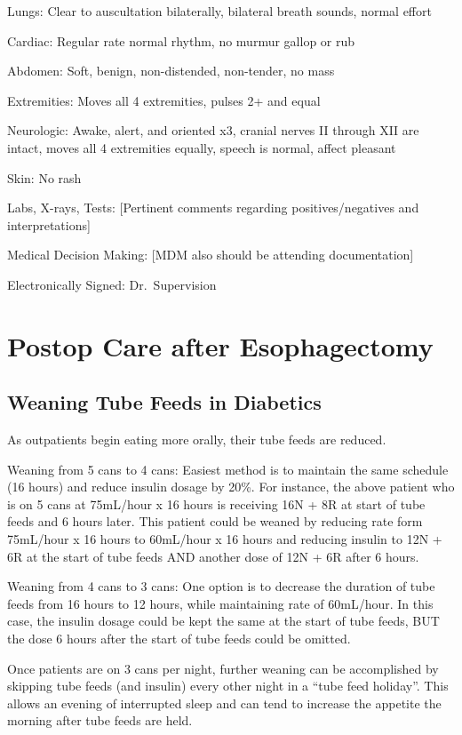 \documentclass[
]{book}
\begin{document}
Lungs: Clear to auscultation bilaterally, bilateral breath sounds, normal effort

Cardiac: Regular rate normal rhythm, no murmur gallop or rub

Abdomen: Soft, benign, non-distended, non-tender, no mass

Extremities: Moves all 4 extremities, pulses 2+ and equal

Neurologic: Awake, alert, and oriented x3, cranial nerves II through XII are intact, moves all 4 extremities equally, speech is normal, affect pleasant

Skin: No rash

Labs, X-rays, Tests: {[}Pertinent comments regarding positives/negatives and interpretations{]}

Medical Decision Making: {[}MDM also should be attending documentation{]}

Electronically Signed: Dr.~Supervision

\hypertarget{mie_postop}{%
\chapter{Postop Care after Esophagectomy}\label{mie_postop}}

\hypertarget{weaning-tube-feeds-in-diabetics}{%
\section{Weaning Tube Feeds in Diabetics}\label{weaning-tube-feeds-in-diabetics}}

As outpatients begin eating more orally, their tube feeds are reduced.

Weaning from 5 cans to 4 cans: Easiest method is to maintain the same schedule (16 hours) and reduce insulin dosage by 20\%. For instance, the above patient who is on 5 cans at 75mL/hour x 16 hours is receiving 16N + 8R at start of tube feeds and 6 hours later. This patient could be weaned by reducing rate form 75mL/hour x 16 hours to 60mL/hour x 16 hours and reducing insulin to 12N + 6R at the start of tube feeds AND another dose of 12N + 6R after 6 hours.

Weaning from 4 cans to 3 cans: One option is to decrease the duration of tube feeds from 16 hours to 12 hours, while maintaining rate of 60mL/hour. In this case, the insulin dosage could be kept the same at the start of tube feeds, BUT the dose 6 hours after the start of tube feeds could be omitted.

Once patients are on 3 cans per night, further weaning can be accomplished by skipping tube feeds (and insulin) every other night in a ``tube feed holiday''. This allows an evening of interrupted sleep and can tend to increase the appetite the morning after tube feeds are held.
\end{document}
